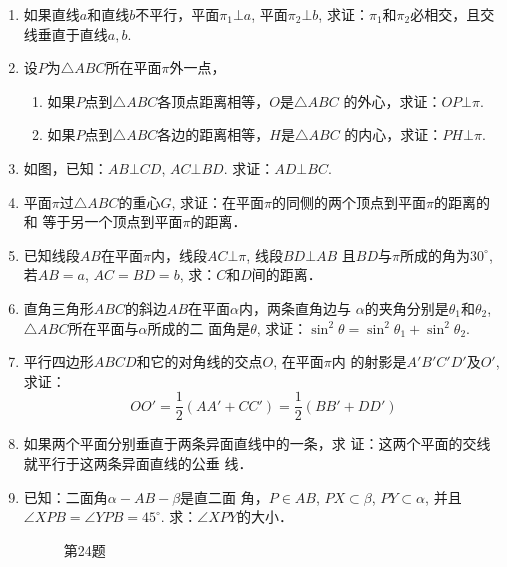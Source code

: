 \begin{enumerate}
\item 如果直线$a$和直线$b$不平行，平面$\pi_1\bot a$, 平面$\pi_2\bot b$, 
求证：$\pi_1$和$\pi_2$必相交，且交线垂直于直线$a,b$.
\item 设$P$为$\triangle ABC$所在平面$\pi$外一点，
\begin{enumerate}
  \item 如果$P$点到$\triangle ABC$各顶点距离相等，$O$是$\triangle ABC$
的外心，求证：$OP\bot\pi$.
\item 如果$P$点到$\triangle ABC$各边的距离相等，$H$是$\triangle ABC$
的内心，求证：$PH\bot\pi$.
\end{enumerate}
\item 如图，已知：$AB\bot CD$, $AC\bot BD$. 
求证：$AD\bot BC$.
\item 平面$\pi$过$\triangle ABC$的重心$G$, 
求证：在平面$\pi$的同侧的两个顶点到平面$\pi$的距离的和
等于另一个顶点到平面$\pi$的距离．
\item 已知线段$AB$在平面$\pi$内，线段$AC\bot \pi$, 线段$BD\bot AB$
且$BD$与$\pi$所成的角为$30^{\circ}$, 若$AB=a$, $AC=BD=b$, 
求：$C$和$D$间的距离．
\item 直角三角形$ABC$的斜边$AB$在平面$\alpha$内，两条直角边与
$\alpha$的夹角分别是$\theta_1$和$\theta_2$, $\triangle ABC$所在平面与$\alpha$所成的二
面角是$\theta$, 求证：$\sin^2\theta=\sin^2\theta_1+\sin^2\theta_2$.
\item 平行四边形$ABCD$和它的对角线的交点$O$, 在平面$\pi$内
的射影是$A'B'C'D'$及$O'$, 求证：
\[OO'=\frac{1}{2}(AA'+CC')= \frac{1}{2}(BB'+DD')\]
\item 如果两个平面分别垂直于两条异面直线中的一条，求
证：这两个平面的交线就平行于这两条异面直线的公垂
线．
\item 已知：二面角$\alpha-AB-\beta$是直二面
角，$P\in AB$, $PX\subset \beta$, $PY\subset \alpha$, 并且
$\angle XPB=\angle YPB=45^{\circ}$. 
求：$\angle XPY$的大小．
\begin{figure}[htp]
  \centering
{}
  \caption*{第24题}
\end{figure}

\end{enumerate}























